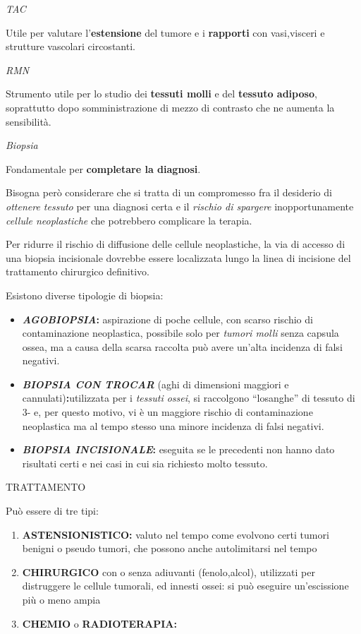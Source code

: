 \documentclass[]{article}
\begin{document}
\emph{TAC}

Utile per valutare l'\textbf{estensione} del tumore e i
\textbf{rapporti} con vasi,visceri e strutture vascolari circostanti.

\emph{RMN}

Strumento utile per lo studio dei \textbf{tessuti molli} e del
\textbf{tessuto adiposo}, soprattutto dopo somministrazione di mezzo di
contrasto che ne aumenta la sensibilità.

\emph{Biopsia}

Fondamentale per \textbf{completare la diagnosi}.

Bisogna però considerare che si tratta di un compromesso fra il
desiderio di \emph{ottenere tessuto} per una diagnosi certa e il
\emph{rischio di spargere} inopportunamente \emph{cellule neoplastiche}
che potrebbero complicare la terapia.

Per ridurre il rischio di diffusione delle cellule neoplastiche, la via
di accesso di una biopsia incisionale dovrebbe essere localizzata lungo
la linea di incisione del trattamento chirurgico definitivo.

Esistono diverse tipologie di biopsia:

\begin{itemize}
\item
  \textbf{\emph{AGOBIOPSIA}:} aspirazione di poche cellule, con scarso
  rischio di contaminazione neoplastica, possibile solo per \emph{tumori
  molli} senza capsula ossea, ma a causa della scarsa raccolta può avere
  un'alta incidenza di falsi negativi.
\item
  \textbf{\emph{BIOPSIA CON TROCAR}} (aghi di dimensioni maggiori e
  cannulati)\textbf{:}utilizzata per i \emph{tessuti ossei}, si
  raccolgono ``losanghe'' di tessuto di 3- e, per questo motivo, vi è un
  maggiore rischio di contaminazione neoplastica ma al tempo stesso una
  minore incidenza di falsi negativi.
\item
  \textbf{\emph{BIOPSIA INCISIONALE}:} eseguita se le precedenti non
  hanno dato risultati certi e nei casi in cui sia richiesto molto
  tessuto.
\end{itemize}

TRATTAMENTO

Può essere di tre tipi:

\begin{enumerate}
\def\labelenumi{\arabic{enumi}.}
\item
  \textbf{ASTENSIONISTICO:} valuto nel tempo come evolvono certi tumori
  benigni o pseudo tumori, che possono anche autolimitarsi nel tempo
\item
  \textbf{CHIRURGICO} con o senza adiuvanti (fenolo,alcol), utilizzati
  per distruggere le cellule tumorali, ed innesti ossei: si può eseguire
  un'escissione più o meno ampia
\item
  \textbf{CHEMIO} o \textbf{RADIOTERAPIA:}
\end{enumerate}
\end{document}
